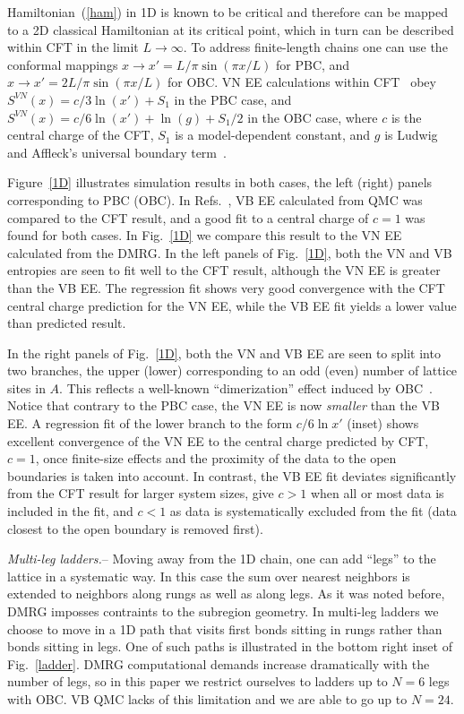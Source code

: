 \documentclass[prl,aps,twocolumn,floatfix,amsmath,amssymb,superscriptaddress,tightenlines]{revtex4}
\begin{document}
Hamiltonian~(\ref{ham}) in 1D is known to be critical and therefore can be
mapped to a 2D classical Hamiltonian at its critical point, which in turn
can be described within CFT in the limit $L\to\infty$.  To address
finite-length chains one can use the conformal mappings $x\to x'=L/\pi
\sin(\pi x / L)$ for PBC, and $x\to x'=2L/\pi \sin(\pi x / L)$ for OBC. VN
EE calculations within CFT~\cite{Cardy, Scholl06} obey $S^{VN}(x)= c/3
\ln(x') + S_1$ in the PBC case, and $S^{VN}(x)= c/6 \ln(x') +
\ln(g)+S_1/2$ in the OBC case, where $c$ is the central charge of the CFT,
$S_1$ is a model-dependent constant, and $g$ is Ludwig and Affleck's
universal boundary term~\cite{AffleckAndLudwig}.

Figure~\ref{1D} illustrates simulation results in both cases, the left
(right) panels corresponding to PBC (OBC). In Refs.~\cite{Alet, Chh}, VB
EE calculated from QMC was compared to the CFT result, and a good fit to a
central charge of $c=1$ was found for both cases.  In Fig.~\ref{1D} we
compare this result to the VN EE calculated from the DMRG.  In the left
panels of Fig.~\ref{1D}, both the VN and VB entropies are seen to fit well
to the CFT result, although the VN EE is greater than the VB EE. The
regression fit shows very good convergence with the CFT central charge
prediction for the VN EE, while the VB EE fit yields a lower value than
predicted result.  

In the right panels of Fig.~\ref{1D}, both the VN and VB EE are seen to
split into two branches, the upper (lower) corresponding to an odd (even)
number of lattice sites in $A$.  This reflects a well-known
``dimerization'' effect induced by OBC~\cite{Ian1}.  Notice that contrary
to the PBC case, the VN EE is now \textit{smaller} than the VB EE. A
regression fit of the lower branch to the form $c/6 \ln {x'}$ (inset)
shows excellent convergence of the VN EE to the central charge predicted
by CFT, $c=1$, once finite-size effects and the proximity of the data to
the open boundaries is taken into account.  In contrast, the VB EE fit
deviates significantly from the CFT result for larger system sizes, give
$c>1$ when all or most data is included in the fit, and $c<1$ as data is
systematically excluded from the fit (data closest to the open boundary is
removed first).

{\it Multi-leg ladders.}-- Moving away from the 1D chain, one can add
``legs'' to the lattice in a systematic way. In this case the sum over
nearest neighbors is extended to neighbors along rungs as well as along
legs.  As it was noted before, DMRG imposses contraints to the subregion
geometry. In multi-leg ladders we choose to move in a 1D path that visits
first bonds sitting in rungs rather than bonds sitting in legs. One of
such paths is illustrated in the bottom right inset of Fig.~\ref{ladder}.
DMRG computational demands increase dramatically with the number of
legs, so in this paper we restrict ourselves to ladders up to $N=6$ legs
with OBC. VB QMC lacks of this limitation and we are able to go up to
$N=24$. 
\end{document}
